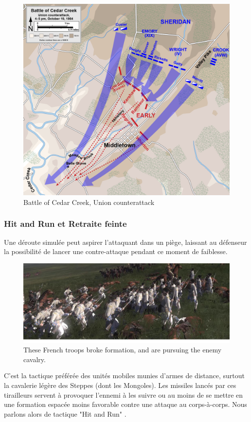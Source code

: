 \documentclass{article}
\begin{document}
\begin{center}
\begin{figure}[H]
\begin{minipage}[H]{0.45\linewidth}
	\includegraphics[width=\linewidth]{../ressources/Cedar_Creek_Union_counterattack}
	\caption{Battle of Cedar Creek, Union counterattack}
\end{minipage}
\hfill
\end{figure}
\cite{counterattack_wiki, couterattack_cedar_creek}
\end{center}

\subsubsection{Hit and Run et Retraite feinte}
Une déroute simulée peut aspirer l'attaquant dans un piège, laissant au défenseur la possibilité de lancer une contre-attaque pendant ce moment de faiblesse.
\begin{figure}[H]
	\begin{centering}
	\includegraphics[width=\linewidth]{../ressources/infantrysquare3}
	\caption{These French troops broke formation, and are pursuing the enemy cavalry. \cite{feigned_retreat}}
	\end{centering}
\end{figure}
C'est la tactique préférée des unités mobiles munies d'armes de distance, surtout la cavalerie légère des Steppes (dont les Mongoles). Les missiles lancés par ces tirailleurs servent à provoquer l'ennemi à les suivre ou au moins de se mettre en une formation espacée moins favorable contre une attaque au corps-à-corps. Nous parlons alors de tactique "Hit and Run" \cite{mongol_army}.
\end{document}
